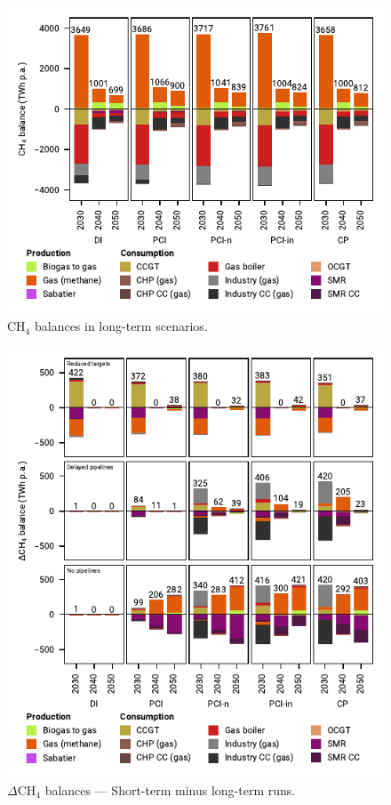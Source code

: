 \documentclass[pdflatex,sn-nature]{sn-jnl}
\theoremstyle{thmstyleone}%
\theoremstyle{thmstyletwo}%
\theoremstyle{thmstylethree}%
\begin{document}
\begin{appendices}
\begin{figure}[htbp]
  \centering
  \includegraphics{figures/balances_overview_gas}
  \caption{CH$_4$ balances in long-term scenarios.}
  \label{fig:balances_overview_gas}
\end{figure}

\begin{figure}[htbp]
  \centering
  \includegraphics{figures/balances_overview_extended_gas}
  \caption{$\Delta$CH$_4$ balances --- Short-term minus long-term runs.}
  \label{fig:balances_overview_extended_gas}
\end{figure}


\end{appendices}
\end{document}
